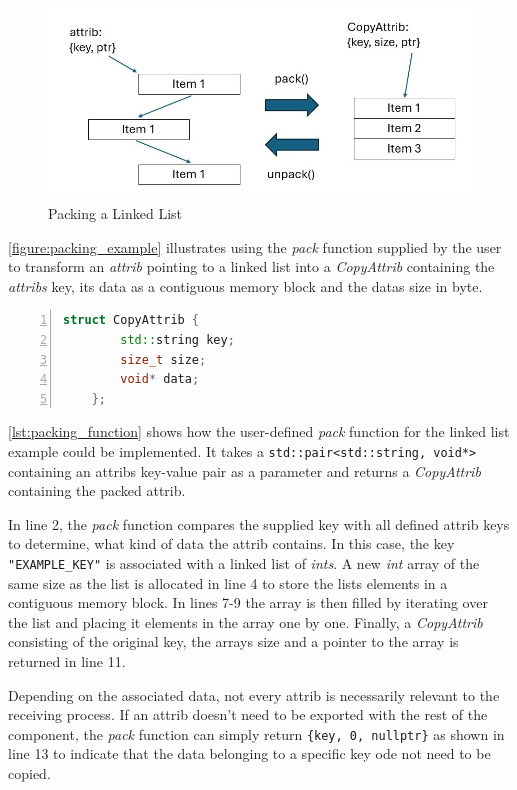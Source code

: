 \begin{figure}[!ht]
    \includegraphics[scale=0.65]{images/packing.jpg}
    \centering
    \caption{Packing a Linked List}
    \label{figure:packing_example}
\end{figure}

\autoref{figure:packing_example} illustrates using the \emph{pack} function supplied by the user
to transform an \emph{attrib} pointing to a linked list into a \emph{CopyAttrib} containing the \emph{attribs} key,
its data as a contiguous memory block and the datas size in byte.

\begin{lstlisting}[language=c++, numbers=left, caption=CopyAttrib Struct, captionpos=b, label={lst:copyattrib}]
    struct CopyAttrib {
        std::string key;
        size_t size;
        void* data;
    };
\end{lstlisting}

\autoref{lst:packing_function} shows how the user-defined \emph{pack} function for the linked list example could be implemented.
It takes a \lstinline|std::pair<std::string, void*>| containing an attribs key-value pair as a parameter and returns a \emph{CopyAttrib} containing the packed attrib.

In line 2, the \emph{pack} function compares the supplied key with all defined attrib keys to determine, what kind of data the attrib contains.
In this case, the key \lstinline|"EXAMPLE_KEY"| is associated with a linked list of \emph{ints}.
A new \emph{int} array of the same size as the list is allocated in line 4 to store the lists elements in a contiguous memory block.
In lines 7-9 the array is then filled by iterating over the list and placing it elements in the array one by one.
Finally, a \emph{CopyAttrib} consisting of the original key, the arrays size and a pointer to the array is returned in line 11.

Depending on the associated data, not every attrib is necessarily relevant to the receiving process.
If an attrib doesn't need to be exported with the rest of the component, the \emph{pack} function can simply return \lstinline|{key, 0, nullptr}| as shown in line 13
to indicate that the data belonging to a specific key ode not need to be copied.


